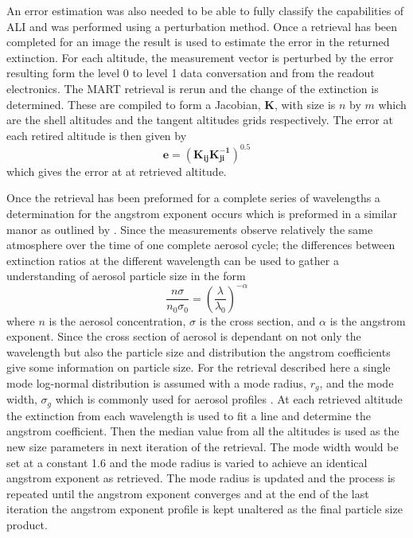 \documentclass[12pt]{article}
\begin{document}
An error estimation was also needed to be able to fully classify the capabilities of ALI and was performed using a perturbation method. Once a retrieval has been completed for an image the result is used to estimate the error in the returned extinction. For each altitude, the measurement vector is perturbed by the error resulting form the level 0 to level 1 data conversation and from the readout electronics. The MART retrieval is rerun and the change of the extinction is determined. These are compiled to form a Jacobian, $\mathbf{K}$, with size is $n$ by $m$ which are the shell altitudes and the tangent altitudes grids respectively. The error at each retired altitude is then given by
\begin{equation}
    \mathbf{e} = \left(\mathbf{K_{ij}}\mathbf{K_{ji}^{-1}}\right)^{0.5}
\end{equation}
which gives the error at at retrieved altitude.

Once the retrieval has been preformed for a complete series of wavelengths a determination for the angstrom exponent occurs which is preformed in a similar manor as outlined by \cite{Rault2013}. Since the measurements observe relatively the same atmosphere over the time of one complete aerosol cycle; the differences between extinction ratios at the different wavelength can be used to gather a understanding of aerosol particle size in the form
\begin{equation}
    \frac{n\sigma}{n_{0}\sigma_{0}} = \left(\frac{\lambda}{\lambda_{0}}\right)^{-\alpha}
    \label{eqn:agstromCoefficient}
\end{equation}
where $n$ is the aerosol concentration, $\sigma$ is the cross section, and $\alpha$ is the angstrom exponent. Since the cross section of aerosol is dependant on not only the wavelength but also the particle size and distribution the angstrom coefficients give some information on particle size. For the retrieval described here a single mode log-normal distribution is assumed with a mode radius, $r_{g}$, and the mode width, $\sigma_{g}$ which is commonly used for aerosol profiles \citep{Bingen2004}. At each retrieved altitude the extinction from each wavelength is used to fit a line and determine the angstrom coefficient. Then the median value from all the altitudes is used as the new size parameters in next iteration of the retrieval. The mode width would be set at a constant 1.6 and the mode radius is varied to achieve an identical angstrom exponent as retrieved. The mode radius is updated and the process is repeated until the angstrom exponent converges and at the end of the last iteration the angstrom exponent profile is kept unaltered as the final particle size product.
\end{document}
